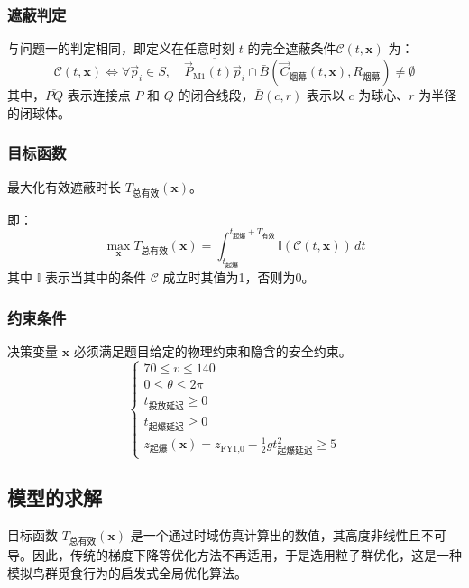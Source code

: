 \documentclass[5pt, withoutpreface,bwprint]{cumcmthesis} %
\begin{document}
    \subsubsection{遮蔽判定}
    与问题一的判定相同，即定义在任意时刻 $t$ 的完全遮蔽条件$\mathcal{C}(t, \mathbf{x})$ 为：
       \begin{equation}
          \mathcal{C}(t, \mathbf{x}) \iff \forall \vec{p}_i \in S, \quad \overline{\vec{P}_{\text{M1}}(t)\vec{p}_i} \cap \bar{B}(\vec{C}_{\text{烟幕}}(t, \mathbf{x}), R_{\text{烟幕}}) \neq \emptyset
       \end{equation}
       其中，$\overline{PQ}$ 表示连接点 $P$ 和 $Q$ 的闭合线段，$\bar{B}(c, r)$ 表示以 $c$ 为球心、$r$ 为半径的闭球体。
       
       
    \subsubsection{目标函数}
    最大化有效遮蔽时长 $T_{\text{总有效}}(\mathbf{x})$。
    
   即：
    \begin{equation}
        \max_{\mathbf{x}} T_{\text{总有效}}(\mathbf{x}) = \int_{t_{\text{起爆}}}^{t_{\text{起爆}} + T_{\text{有效}}} \mathbb{I}(\mathcal{C}(t, \mathbf{x})) \,dt
    \end{equation}
    其中 $\mathbb{I}$ 表示当其中的条件 $\mathcal{C}$ 成立时其值为1，否则为0。
    
    \subsubsection{约束条件}
    决策变量 $\mathbf{x}$ 必须满足题目给定的物理约束和隐含的安全约束。
    \begin{equation}
    \begin{cases} 
        70 \le v \le 140 \\
        0 \le \theta \le 2\pi \\
        t_{\text{投放延迟}} \ge 0 \\
        t_{\text{起爆延迟}} \ge 0 \\
        z_{\text{起爆}}(\mathbf{x}) = z_{\text{FY1,0}} - \frac{1}{2}gt_{\text{起爆延迟}}^2 \ge 5 
    \end{cases}
    \end{equation}
    \subsection{模型的求解}
    目标函数 $T_{\text{总有效}}(\mathbf{x})$ 是一个通过时域仿真计算出的数值，其高度非线性且不可导。因此，传统的梯度下降等优化方法不再适用，于是选用粒子群优化，这是一种模拟鸟群觅食行为的启发式全局优化算法。
   
\end{document}
